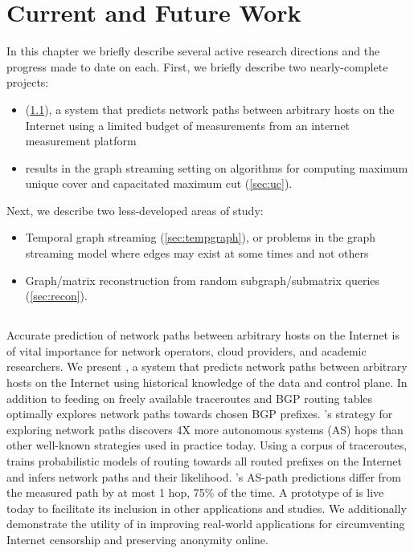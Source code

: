 \chapter{Current and Future Work}
\label{chap:futurework}

In this chapter we briefly describe several active research directions and the progress made to date on each.  First, we briefly describe two nearly-complete projects: 
\begin{itemize}
\item \sysname{} (\ref{sec:pc}), a system that predicts network paths between arbitrary hosts on the Internet using a limited budget of measurements from an internet measurement platform
\item results in the graph streaming setting on algorithms for computing maximum unique cover and capacitated maximum cut (\ref{sec:uc}).
\end{itemize}

Next, we describe two less-developed areas of study:

\begin{itemize}
\item Temporal graph streaming (\ref{sec:tempgraph}), or problems in the graph streaming model where edges may exist at some times and not others
\item Graph/matrix reconstruction from random subgraph/submatrix queries (\ref{sec:recon}).
\end{itemize}

\section{\sysname}
\label{sec:pc}

Accurate prediction of network paths between arbitrary hosts on the Internet is of
vital importance for network operators, cloud providers, and academic researchers.
We present \sysname, a system that predicts network paths between arbitrary hosts on
the Internet using historical knowledge of the data and control plane. In addition to feeding on
freely available traceroutes and BGP routing tables \sysname{} optimally explores
network paths towards chosen BGP prefixes. \sysname's
strategy for exploring network paths discovers 4X more autonomous systems (AS) 
hops than other well-known strategies used in practice today.
Using a corpus of traceroutes, \sysname{} trains probabilistic models
of routing towards all routed prefixes on the Internet and 
infers network paths and their likelihood.
\sysname's AS-path predictions differ from the measured path by at most 1 hop, 75\% of the time.
A prototype of
\sysname is live today to facilitate its 
inclusion in other applications and studies.
We additionally demonstrate the utility of \sysname{} in improving
real-world applications for circumventing Internet censorship and preserving anonymity online.

